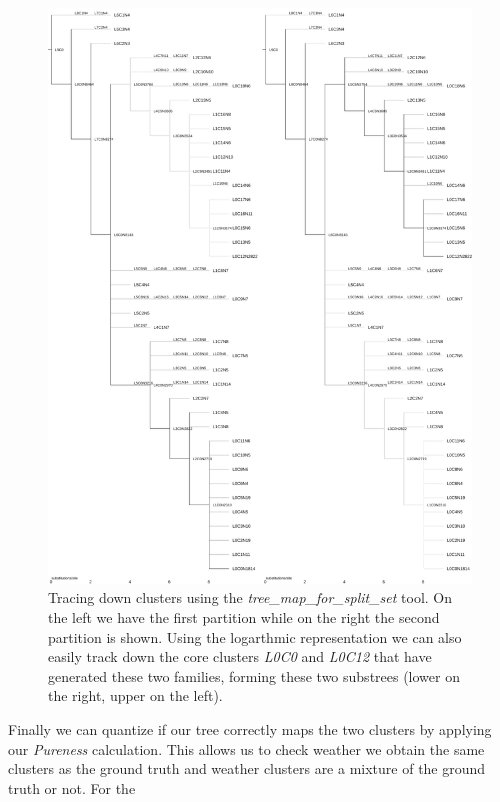 \begin{figure}
  \begin{center}
    \includegraphics[scale=0.3]{tree-clust-tutorial.pdf}
    \caption{Tracing down clusters using the
      \emph{tree\_map\_for\_split\_set} tool. On the left we have the
      first partition while on the right the second partition is
      shown. Using the logarthmic representation we can also easily
      track down the core clusters \emph{L0C0} and \emph{L0C12} that
      have generated these two families, forming these two substrees
      (lower on the right, upper on the left).}
    \label{fig-treemapss-tutorial}
  \end{center}
\end{figure}
Finally we can quantize if our tree correctly maps the two
clusters by applying our \emph{Pureness} calculation. This allows us
to check weather we obtain the same clusters as the ground truth and
weather clusters are a mixture of the ground truth or not. For the
